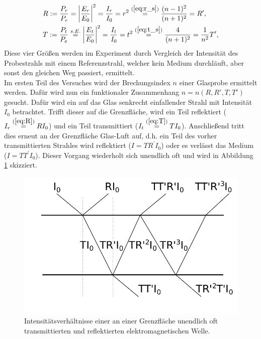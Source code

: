 	\begin{align}
		&R := \frac{P_r}{P_e} = \left\vert\frac{E_r}{E_0}\right\vert^2 = \frac{I_r}{I_0} = r^2 \overset{(\ref{eq:r_s})}{=} \frac{(n-1)^2}{(n+1)^2} = R^\prime, \label{eq:R}\\
		&T := \frac{P_t}{P_e} \overset{s.E.}{=} \left\vert\frac{E_t}{E_0}\right\vert^2 = \frac{I_t}{I_0} = t^2 \overset{(\ref{eq:t_s})}{=} \frac{4}{(n+1)^2} = \frac{1}{n^2}T^\prime, \label{eq:T}
	\end{align}
	Diese vier Größen werden im Experiment durch Vergleich der Intensität des Probestrahls mit einem Referenzstrahl, welcher kein Medium durchläuft, aber sonst den gleichen Weg passiert, ermittelt.\\
	Im ersten Teil des Versuches wird der Brechungsindex $n$ einer Glasprobe ermittelt werden. Dafür wird nun ein funktionaler Zusammenhang $n = n(R, R', T, T')$ gesucht. Dafür wird ein auf das Glas senkrecht einfallender Strahl mit Intensität $I_0$ betrachtet. Trifft dieser auf die Grenzfläche, wird ein Teil reflektiert ($I_r \overset{(\ref{eq:R})}{=} R I_0$) und ein Teil transmittiert ($I_t \overset{(\ref{eq:T})}{=} T I_0$). Anschließend tritt dies erneut an der Grenzfläche Glas-Luft auf, d.h. ein Teil des vorher transmittierten Strahles wird reflektiert ($I = T R^\prime I_0$) oder es verlässt das Medium ($I = T T^\prime I_0$). Dieser Vorgang wiederholt sich unendlich oft und wird in Abbildung \ref{fig:brechungsindex} skizziert.
	\begin{figure}[ht]
		\centering
		\includegraphics[width=\linewidth]{pic/Brechungsindex.pdf}
		\caption{Intensitätsverhältnisse einer an einer Grenzfläche unendlich oft transmittierten und reflektierten elektromagnetischen Welle.}
		\label{fig:brechungsindex}	
	\end{figure}
